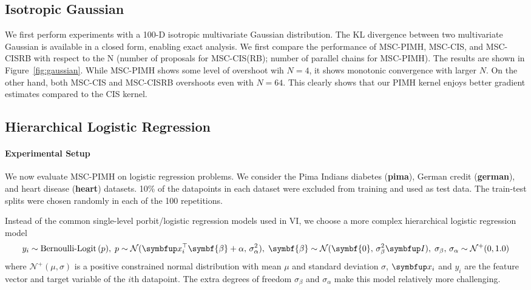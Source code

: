 \subsection{Isotropic Gaussian}
We first perform experiments with a 100-D isotropic multivariate Gaussian distribution.
The KL divergence between two multivariate Gaussian is available in a closed form, enabling exact analysis.
We first compare the performance of MSC-PIMH, MSC-CIS, and MSC-CISRB with respect to the N (number of proposals for MSC-CIS(RB); number of parallel chains for MSC-PIMH).
The results are shown in Figure~\ref{fig:gaussian}.
While MSC-PIMH shows some level of overshoot wih \(N=4\), it shows monotonic convergence with larger \(N\).
On the other hand, both MSC-CIS and MSC-CISRB overshoots even with \(N=64\).
This clearly shows that our PIMH kernel enjoys better gradient estimates compared to the CIS kernel.

\subsection{Hierarchical Logistic Regression}
\paragraph{Experimental Setup}
We now evaluate MSC-PIMH on logistic regression problems.
We consider the Pima Indians diabetes (\textbf{pima}), German credit (\textbf{german}), and heart disease (\textbf{heart}) datasets.
10\% of the datapoints in each dataset were excluded from training and used as test data.
The train-test splits were chosen randomly in each of the 100 repetitions.

Instead of the common single-level porbit/logistic regression models used in VI, we choose a more complex hierarchical logistic regression model \\
\begin{equation}
y_i \sim \text{Bernoulli-Logit}\,(p),\;
p \sim \mathcal{N}(\vx_i^{\top}\symbf{\beta} + \alpha,\, \sigma_{\alpha}^2),\;
\symbf{\beta} \sim \mathcal{N}(\symbf{0},\, \sigma_{\beta}^2 \mI),\;
\sigma_{\beta},\,\sigma_{\alpha} \sim \mathcal{N}^{+}(0, 1.0)
\end{equation}
where \(\mathcal{N}^+(\mu, \sigma)\) is a positive constrained normal distribution with mean \(\mu\) and standard deviation \(\sigma\), \(\vx_i\) and \(y_i\) are the feature vector and target variable of the \(i\)th datapoint.
The extra degrees of freedom \(\sigma_{\beta}\) and \(\sigma_{\alpha}\) make this model relatively more challenging.

